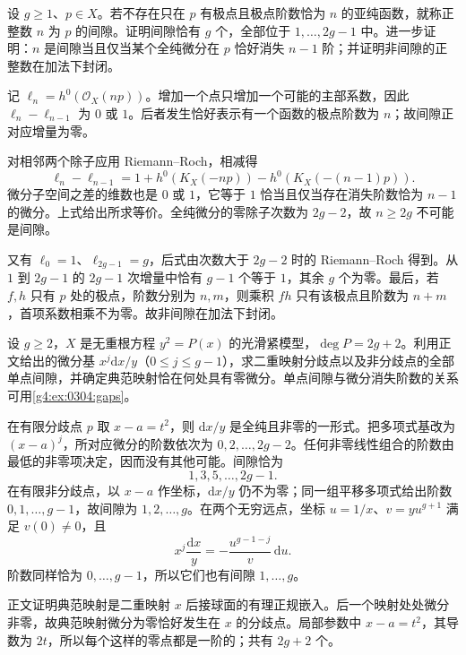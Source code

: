 \begin{exercise}
	\label{g4:ex:0304:gaps}
	设 \(g\ge1\)、\(p\in X\)。若不存在只在 \(p\) 有极点且极点阶数恰为 \(n\) 的亚纯函数，就称正整数 \(n\) 为 \(p\) 的间隙。证明间隙恰有 \(g\) 个，全部位于 \(1,\ldots,2g-1\) 中。进一步证明：\(n\) 是间隙当且仅当某个全纯微分在 \(p\) 恰好消失 \(n-1\) 阶；并证明非间隙的正整数在加法下封闭。
\end{exercise}
\begin{solution}
	记 \(\ell_n=h^0(\mathcal O_X(np))\)。增加一个点只增加一个可能的主部系数，因此 \(\ell_n-\ell_{n-1}\) 为 \(0\) 或 \(1\)。后者发生恰好表示有一个函数的极点阶数为 \(n\)；故间隙正对应增量为零。

	对相邻两个除子应用 Riemann--Roch，相减得
	\[
		\ell_n-\ell_{n-1}
		=1+h^0(K_X(-np))-h^0(K_X(-(n-1)p)).
	\]
	微分子空间之差的维数也是 \(0\) 或 \(1\)，它等于 \(1\) 恰当且仅当存在消失阶数恰为 \(n-1\) 的微分。上式给出所求等价。全纯微分的零除子次数为 \(2g-2\)，故 \(n\ge2g\) 不可能是间隙。

	又有 \(\ell_0=1\)、\(\ell_{2g-1}=g\)，后式由次数大于 \(2g-2\) 时的 Riemann--Roch 得到。从 \(1\) 到 \(2g-1\) 的 \(2g-1\) 次增量中恰有 \(g-1\) 个等于 \(1\)，其余 \(g\) 个为零。最后，若 \(f,h\) 只有 \(p\) 处的极点，阶数分别为 \(n,m\)，则乘积 \(fh\) 只有该极点且阶数为 \(n+m\)，首项系数相乘不为零。故非间隙在加法下封闭。
\end{solution}

\begin{exercise}
	\label{g4:ex:0305:hyperelliptic-canonical}
	设 \(g\ge2\)，\(X\) 是无重根方程 \(y^2=P(x)\) 的光滑紧模型，\(\deg P=2g+2\)。利用正文给出的微分基 \(x^j\mathrm{d}x/y\)（\(0\le j\le g-1\)），求二重映射分歧点以及非分歧点的全部单点间隙，并确定典范映射恰在何处具有零微分。单点间隙与微分消失阶数的关系可用\cref{g4:ex:0304:gaps}。
\end{exercise}
\begin{solution}
	在有限分歧点 \(p\) 取 \(x-a=t^2\)，则 \(\mathrm{d}x/y\) 是全纯且非零的一形式。把多项式基改为 \((x-a)^j\)，所对应微分的阶数依次为 \(0,2,\ldots,2g-2\)。任何非零线性组合的阶数由最低的非零项决定，因而没有其他可能。间隙恰为
	\[
		1,3,5,\ldots,2g-1.
	\]
	在有限非分歧点，以 \(x-a\) 作坐标，\(\mathrm{d}x/y\) 仍不为零；同一组平移多项式给出阶数 \(0,1,\ldots,g-1\)，故间隙为 \(1,2,\ldots,g\)。在两个无穷远点，坐标 \(u=1/x\)、\(v=yu^{g+1}\) 满足 \(v(0)\ne0\)，且
	\[
		x^j\frac{\mathrm{d}x}{y}=-\frac{u^{g-1-j}}{v}\,\mathrm{d}u.
	\]
	阶数同样恰为 \(0,\ldots,g-1\)，所以它们也有间隙 \(1,\ldots,g\)。

	正文证明典范映射是二重映射 \(x\) 后接球面的有理正规嵌入。后一个映射处处微分非零，故典范映射微分为零恰好发生在 \(x\) 的分歧点。局部参数中 \(x-a=t^2\)，其导数为 \(2t\)，所以每个这样的零点都是一阶的；共有 \(2g+2\) 个。
\end{solution}

